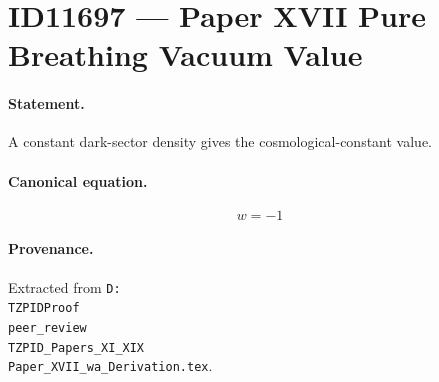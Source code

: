 \section*{ID11697 --- Paper XVII Pure Breathing Vacuum Value}

\paragraph{Statement.}
A constant dark-sector density gives the cosmological-constant value.

\paragraph{Canonical equation.}
\[
w=-1
\]

\paragraph{Provenance.}
Extracted from \texttt{D:\\TZPIDProof\\peer\_review\\TZPID\_Papers\_XI\_XIX\\Paper\_XVII\_wa\_Derivation.tex}.
